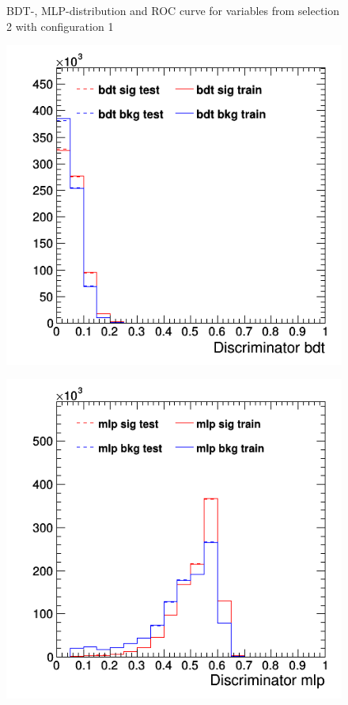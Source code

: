 \documentclass[11pt]{scrartcl}
\begin{document}
\begin{figure}[H]
	\caption{BDT-, MLP-distribution and ROC curve for variables from selection 2 with configuration 1}
	 \label{fig:ROC_s2_config1}
	\end{figure}
	
	\begin{figure}[H]
	\centering
	\begin{minipage}{.5\textwidth}
	  \centering
	  \includegraphics[width=0.75\linewidth]{figures/MVA/select2/config2/discriminator_bdt.png}
	  \label{fig:distr_s2_config2_bdt}
	\end{minipage}%
	\begin{minipage}{.5\textwidth}
	  \centering
	  \includegraphics[width=0.75\linewidth]{figures/MVA/select2/config2/discriminator_mlp.png}

\end{minipage}
\end{figure}
\end{document}
